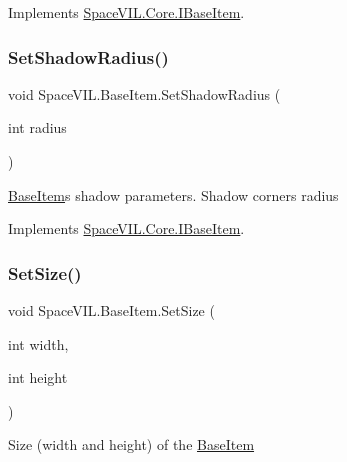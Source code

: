 Implements \mbox{\hyperlink{interface_space_v_i_l_1_1_core_1_1_i_base_item}{Space\+V\+I\+L.\+Core.\+I\+Base\+Item}}.

\mbox{\label{class_space_v_i_l_1_1_base_item_a1238f2ea9b5a7cffdf53f5ce63222fc3}} 
\subsubsection{\texorpdfstring{Set\+Shadow\+Radius()}{SetShadowRadius()}}
{\footnotesize\ttfamily void Space\+V\+I\+L.\+Base\+Item.\+Set\+Shadow\+Radius (\begin{DoxyParamCaption}\item[{int}]{radius }\end{DoxyParamCaption})}



\mbox{\hyperlink{class_space_v_i_l_1_1_base_item}{Base\+Item}}\textquotesingle{}s shadow parameters. Shadow corners radius 



Implements \mbox{\hyperlink{interface_space_v_i_l_1_1_core_1_1_i_base_item}{Space\+V\+I\+L.\+Core.\+I\+Base\+Item}}.

\mbox{\label{class_space_v_i_l_1_1_base_item_a4ac00a12fcbf63a467fcb4fc11652513}} 
\subsubsection{\texorpdfstring{Set\+Size()}{SetSize()}}
{\footnotesize\ttfamily void Space\+V\+I\+L.\+Base\+Item.\+Set\+Size (\begin{DoxyParamCaption}\item[{int}]{width,  }\item[{int}]{height }\end{DoxyParamCaption})}



Size (width and height) of the \mbox{\hyperlink{class_space_v_i_l_1_1_base_item}{Base\+Item}} 



